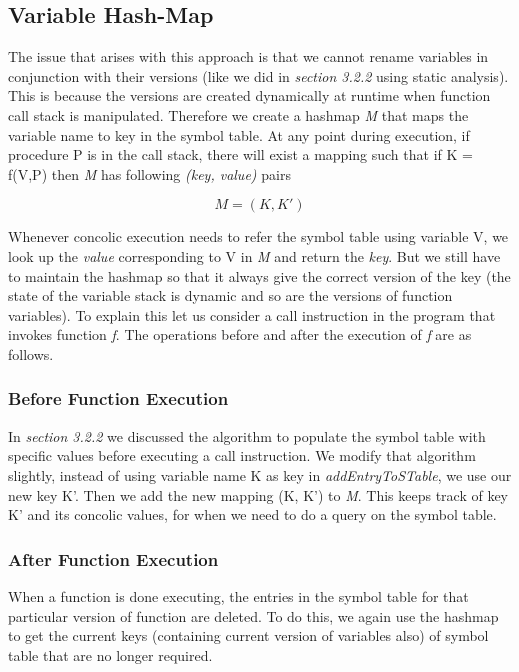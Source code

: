 \documentclass[12pt,oneside]{book}
\begin{document}
\subsection{Variable Hash-Map}
The issue that arises with this approach is that we cannot rename variables in conjunction with their versions (like we did in \textit{section 3.2.2} using static analysis). This is because the versions are created dynamically at runtime when function call stack is manipulated. Therefore we create a hashmap \textit{M} that maps the variable name to key in the symbol table. At any point during execution, if procedure P is in the call stack, there will exist a mapping such that if K = f(V,P) then \textit{M} has following \textit{(key, value)} pairs

\begin{equation}
\textit{M} = (K,K')
\end{equation}

Whenever concolic execution needs to refer the symbol table using variable V, we look up the \textit{value} corresponding to V in \textit{M} and return the \textit{key}. But we still have to maintain the hashmap so that it always give the correct version of the key (the state of the variable stack is dynamic and so are the versions of function variables). To explain this let us consider a call instruction in the program that invokes function \textit{f}. The operations before and after the execution of \textit{f} are as follows.

\subsubsection{Before Function Execution}
In \textit{section 3.2.2} we discussed the algorithm to populate the symbol table with specific values before executing a call instruction. We modify that algorithm slightly, instead of using variable name K as key in \textit{addEntryToSTable}, we use our new key K'. Then we add the new mapping (K, K') to \textit{M}. This keeps track of key K' and its concolic values, for when we need to do a query on the symbol table.

\newpage
\subsubsection{After Function Execution}
When a function is done executing, the entries in the symbol table for that particular version of function are deleted. To do this, we again use the hashmap to get the current keys (containing current version of variables also) of symbol table that are no longer required.
\end{document}
